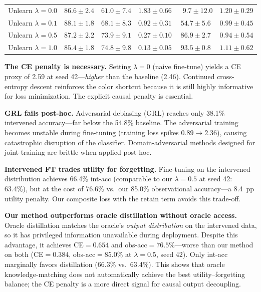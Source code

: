 \documentclass{article}
\begin{document}
\begin{table}[t]
\begin{tabular}{lccccc}
Unlearn $\lambda{=}0.0$              & $86.6 \pm 2.4$ & $61.0 \pm 7.4$ & $1.83 \pm 0.66$ & $\;\;9.7 \pm 12.0$  & $1.20 \pm 0.29$ \\
Unlearn $\lambda{=}0.1$              & $\mathbf{88.1 \pm 1.8}$ & $68.1 \pm 8.3$ & $0.92 \pm 0.31$ & $54.7 \pm 5.6$ & $0.99 \pm 0.45$ \\
Unlearn $\lambda{=}0.5$              & $87.2 \pm 2.2$ & $73.9 \pm 9.1$ & $0.27 \pm 0.10$ & $\mathbf{86.9 \pm 2.7}$ & $\mathbf{0.94 \pm 0.54}$ \\
Unlearn $\lambda{=}1.0$              & $85.4 \pm 1.8$ & $\mathbf{74.8 \pm 9.8}$ & $\mathbf{0.13 \pm 0.05}$ & $93.5 \pm 0.8$ & $1.11 \pm 0.62$ \\
\bottomrule
\end{tabular}
\end{table}

\textbf{The CE penalty is necessary.}  Setting $\lambda = 0$ (naive fine-tune)
yields a CE proxy of 2.59 at seed 42—\emph{higher} than the baseline (2.46).
Continued cross-entropy descent reinforces the color shortcut because it is
still highly informative for loss minimization.  The explicit causal penalty is
essential.

\textbf{GRL fails post-hoc.}  Adversarial debiasing (GRL) reaches only 38.1\%
intervened accuracy—far below the 54.8\% baseline.  The adversarial training
becomes unstable during fine-tuning (training loss spikes $0.89 \to 2.36$),
causing catastrophic disruption of the classifier.  Domain-adversarial methods
designed for joint training are brittle when applied post-hoc.

\textbf{Intervened FT trades utility for forgetting.}  Fine-tuning on the
intervened distribution achieves 66.4\% int-acc (comparable to our
$\lambda{=}0.5$ at seed 42: 63.4\%), but at the cost of 76.6\% vs.\ our 85.0\%
observational accuracy—a 8.4~pp utility penalty.  Our composite loss with the
retain term avoids this trade-off.

\textbf{Our method outperforms oracle distillation without oracle access.}
Oracle distillation matches the oracle's \emph{output distribution} on the
intervened data, so it has privileged information unavailable during
deployment.  Despite this advantage, it achieves CE$=0.654$ and
obs-acc$=76.5\%$—worse than our method on both (CE$=0.384$, obs-acc$=85.0\%$
at $\lambda{=}0.5$, seed 42).  Only int-acc marginally favors distillation
(66.3\% vs.\ 63.4\%).  This shows that oracle knowledge-matching does not
automatically achieve the best utility--forgetting balance; the CE penalty
is a more direct signal for causal output decoupling.
\end{document}
